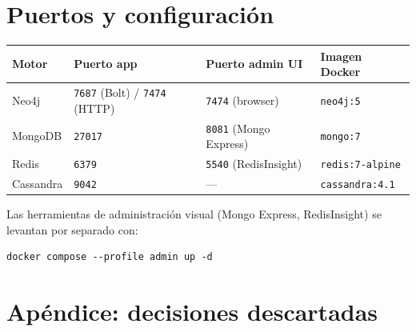 \documentclass[12pt, a4paper]{article}
\newcommand{\code}[1]{\texttt{#1}}
\begin{document}
\section{Puertos y configuración}
\label{sec:config}

\begin{tabularx}{\textwidth}{@{}llll@{}}
  \toprule
  \textbf{Motor}     & \textbf{Puerto app} & \textbf{Puerto admin UI} & \textbf{Imagen Docker} \\
  \midrule
  Neo4j              & \code{7687} (Bolt) / \code{7474} (HTTP) & \code{7474} (browser) & \code{neo4j:5} \\
  MongoDB            & \code{27017}        & \code{8081} (Mongo Express) & \code{mongo:7} \\
  Redis              & \code{6379}         & \code{5540} (RedisInsight)  & \code{redis:7-alpine} \\
  Cassandra          & \code{9042}         & —                           & \code{cassandra:4.1} \\
  \bottomrule
\end{tabularx}

\vspace{0.5em}
Las herramientas de administración visual (Mongo Express, RedisInsight)
se levantan por separado con:

\begin{lstlisting}[style=redis]
docker compose --profile admin up -d
\end{lstlisting}

\section*{Apéndice: decisiones descartadas}
\end{document}
